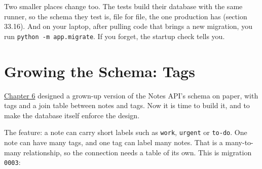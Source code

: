 Two smaller places change too. The tests build their database with the same runner, so the schema they test is, file for file, the one production has (section 33.16). And on your laptop, after pulling code that brings a new migration, you run \texttt{python\ -m\ app.migrate}. If you forget, the startup check tells you.

\setcounter{section}{10}
\section{Growing the Schema: Tags}\label{33-logic-execution:3311-growing-the-schema-tags}

\hyperref[ch:06-local-dependencies]{Chapter 6} designed a grown-up version of the Notes API's schema on paper, with tags and a join table between notes and tags. Now it is time to build it, and to make the database itself enforce the design.

The feature: a note can carry short labels such as \texttt{work}, \texttt{urgent} or \texttt{to-do}. One note can have many tags, and one tag can label many notes. That is a many-to-many relationship, so the connection needs a table of its own. This is migration \texttt{0003}:

